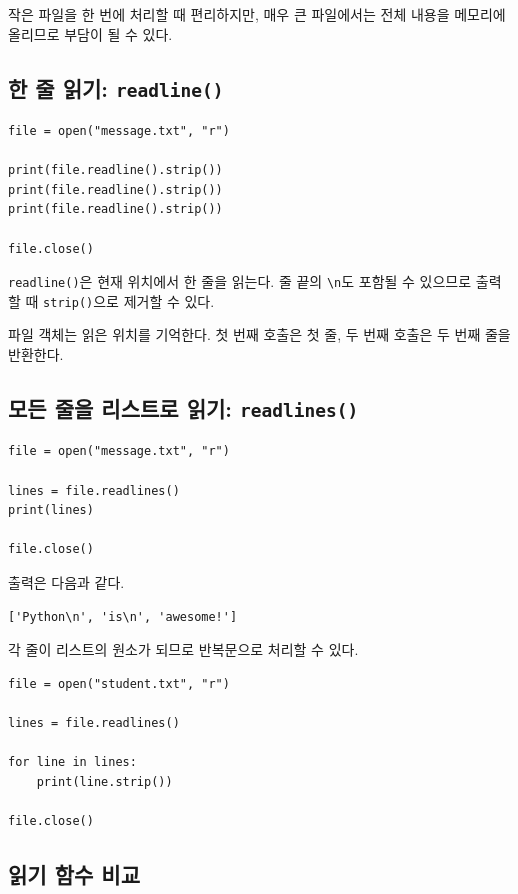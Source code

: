 \documentclass[11pt,a4paper]{article}
\begin{document}
작은 파일을 한 번에 처리할 때 편리하지만, 매우 큰 파일에서는 전체 내용을 메모리에 올리므로 부담이 될 수 있다.

\subsection{한 줄 읽기: \texttt{readline()}}

\begin{lstlisting}
file = open("message.txt", "r")

print(file.readline().strip())
print(file.readline().strip())
print(file.readline().strip())

file.close()
\end{lstlisting}

\texttt{readline()}은 현재 위치에서 한 줄을 읽는다. 줄 끝의 \texttt{\textbackslash n}도 포함될 수 있으므로 출력할 때 \texttt{strip()}으로 제거할 수 있다.

파일 객체는 읽은 위치를 기억한다. 첫 번째 호출은 첫 줄, 두 번째 호출은 두 번째 줄을 반환한다.

\subsection{모든 줄을 리스트로 읽기: \texttt{readlines()}}

\begin{lstlisting}
file = open("message.txt", "r")

lines = file.readlines()
print(lines)

file.close()
\end{lstlisting}

출력은 다음과 같다.

\begin{verbatim}
['Python\n', 'is\n', 'awesome!']
\end{verbatim}

각 줄이 리스트의 원소가 되므로 반복문으로 처리할 수 있다.

\begin{lstlisting}
file = open("student.txt", "r")

lines = file.readlines()

for line in lines:
    print(line.strip())

file.close()
\end{lstlisting}

\subsection{읽기 함수 비교}
\end{document}
